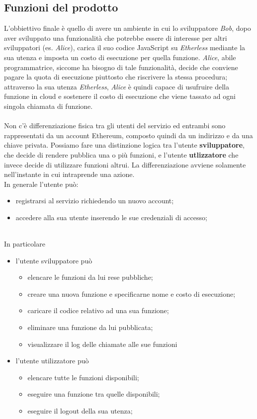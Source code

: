 \subsection{Funzioni del prodotto}
L'obbiettivo finale è quello di avere un ambiente in cui lo sviluppatore \textit{Bob}, dopo aver sviluppato una funzionalità che potrebbe essere di interesse per altri sviluppatori (es. \textit{Alice}), carica il suo codice JavaScript su \textit{Etherless} mediante la sua utenza e imposta un costo di esecuzione per quella funzione. \textit{Alice}, abile programmatrice, siccome ha bisogno di tale funzionalità, decide che conviene pagare la quota di esecuzione piuttosto che riscrivere la stessa procedura; attraverso la sua utenza \textit{Etherless}, \textit{Alice} è quindi capace di usufruire della funzione in cloud e sostenere il costo di esecuzione che viene tassato ad ogni singola chiamata di funzione.
\\\\
Non c'è differenziazione fisica tra gli utenti del servizio ed entrambi sono rappresentati da un account Ethereum\glo, composto quindi da un indirizzo e da una chiave privata. Possiamo fare una distinzione logica tra l'utente \textbf{sviluppatore}, che decide di rendere pubblica una o più funzioni, e l'utente \textbf{utlizzatore} che invece decide di utilizzare funzioni altrui. La differenziazione avviene solamente nell'instante in cui intraprende una azione. 
\\In generale l'utente può:
\begin{itemize}
	\item registrarsi al servizio richiedendo un nuovo account;
	\item accedere alla sua utente inserendo le sue credenziali di accesso;
\end{itemize}
\\In particolare
\begin{itemize}
	\item l'utente sviluppatore può
	\begin{itemize}
		\item elencare le funzioni da lui rese pubbliche;
		\item creare una nuova funzione e specificarne nome e costo di esecuzione;
		\item caricare il codice relativo ad una sua funzione;
		\item eliminare una funzione da lui pubblicata;
		\item visualizzare il log delle chiamate alle sue funzioni
	\end{itemize}
	\item l'utente utilizzatore può
	\begin{itemize}
		\item elencare tutte le funzioni disponibili;
		\item eseguire una funzione tra quelle disponibili;
		\item eseguire il logout della sua utenza;
	\end{itemize}
\end{itemize}


